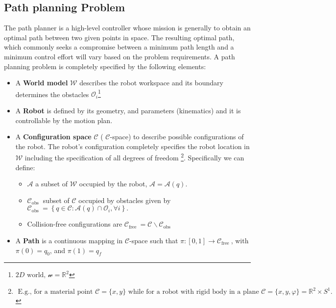\subsection{Path planning Problem}
The path planner is a high-level controller whose mission is generally to obtain an optimal path between two given points in space. The resulting optimal path, which commonly seeks a
compromise between a minimum path length and a minimum
control effort will vary based on the problem requirements.
A path planning problem is completely specified by the following elements:
\begin{itemize}
    \item  A \textbf{World model} $\mathcal{W}$  describes the robot workspace and its boundary determines the obstacles $\mathcal{O}_i$\footnote{$
2 D \text { world, } \mathcal{w}=\mathbb{R}^2
$}
\item  A \textbf{Robot} is defined by its geometry, and parameters (kinematics) and it is controllable by the motion plan.
\item   A \textbf{Configuration space}  $\mathcal{C}$  ( $\mathcal{C}$-space)  to describe possible configurations of the robot. The robot's configuration completely specifies the robot location in $\mathcal{W}$ including the specification of all degrees of freedom \footnote{$
\text { E.g., for a material point } \mathcal{C}=\{x, y\} \text{ while for  a robot with rigid body in a plane } \mathcal{C}=\{x, y, \varphi\}=\mathbb{R}^2 \times S^1 \text {. }$}. Specifically we can define:
\begin{itemize}
    \item $\mathcal{A}$ a subset of $\mathcal{W}$ occupied by the robot, $\mathcal{A}=\mathcal{A}(q)$.
    \item $\mathcal{C}_{\text {obs }}$  subset of $\mathcal{C}$ occupied by obstacles given by $
    \mathcal{C}_{\text {obs }}=\left\{q \in \mathcal{C}: \mathcal{A}(q) \cap \mathcal{O}_i, \forall i\right\} .
    $
    \item Collision-free configurations are  $
    \mathcal{C}_{\text {free }}=\mathcal{C} \backslash \mathcal{C}_{\text {obs }}
    $
\end{itemize}
\item A \textbf{Path} is a continuous mapping in $\mathcal{C}$-space such that $\pi:[0,1] \rightarrow \mathcal{C}_{\text {free }}$, with $\pi(0)=q_0$, and $\pi(1)=q_f$
\end{itemize}

